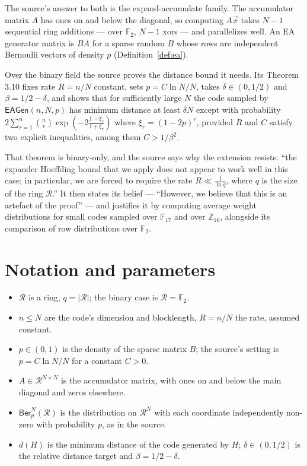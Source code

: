 \documentclass{aicr-conjecture}
\newcommand{\F}{\mathbb{F}}
\newcommand{\Ring}{\mathcal{R}}
\newcommand{\Ber}{\mathsf{Ber}}
\newcommand{\EAGen}{\mathsf{EAGen}}
\newcommand{\dmin}{d}
\begin{document}
The source's answer to both is the expand-accumulate family. The
accumulator matrix $A$ has ones on and below the diagonal, so computing
$A\vec{x}$ takes $N-1$ sequential ring additions --- over $\F_{2}$, $N-1$
xors --- and parallelizes well. An EA generator matrix is $BA$ for a sparse
random $B$ whose rows are independent Bernoulli vectors of density $p$
(Definition~\ref{def:ea}).

Over the binary field the source proves the distance bound it needs. Its
Theorem 3.10 fixes rate $R = n/N$ constant, sets $p = C\ln N / N$, takes
$\delta \in (0,1/2)$ and $\beta = 1/2 - \delta$, and shows that for
sufficiently large $N$ the code sampled by $\EAGen(n,N,p)$ has minimum
distance at least $\delta N$ except with probability
$2\sum_{r=1}^{n}\binom{n}{r}\exp(-2\frac{1-\xi_{r}}{1+\xi_{r}})$ where
$\xi_{r} = (1-2p)^{r}$, provided $R$ and $C$ satisfy two explicit
inequalities, among them $C > 1/\beta^{2}$.

That theorem is binary-only, and the source says why the extension
resists: ``the expander Hoeffding bound that we apply does not appear to
work well in this case; in particular, we are forced to require the rate
$R \ll \frac{1}{\ln q}$, where $q$ is the size of the ring $\Ring$.''
It then states its belief --- ``However, we believe that this is an artefact
of the proof'' --- and justifies it by computing average weight
distributions for small codes sampled over $\F_{17}$ and over
$\mathbb{Z}_{16}$, alongside its comparison of row distributions over
$\F_{2}$.

\section{Notation and parameters}\label{sec:notation}

\begin{itemize}[nosep]
  \item $\Ring$ is a ring, $q = |\Ring|$; the binary case is $\Ring =
    \F_{2}$.
  \item $n \le N$ are the code's dimension and blocklength, $R = n/N$ the
    rate, assumed constant.
  \item $p \in (0,1)$ is the density of the sparse matrix $B$; the
    source's setting is $p = C \ln N / N$ for a constant $C > 0$.
  \item $A \in \Ring^{N \times N}$ is the accumulator matrix, with ones
    on and below the main diagonal and zeros elsewhere.
  \item $\Ber_{p}^{N}(\Ring)$ is the distribution on $\Ring^{N}$ with
    each coordinate independently non-zero with probability $p$, as in
    the source.
  \item $\dmin(H)$ is the minimum distance of the code generated by $H$;
    $\delta \in (0,1/2)$ is the relative distance target and $\beta =
    1/2 - \delta$.
\end{itemize}
\end{document}
